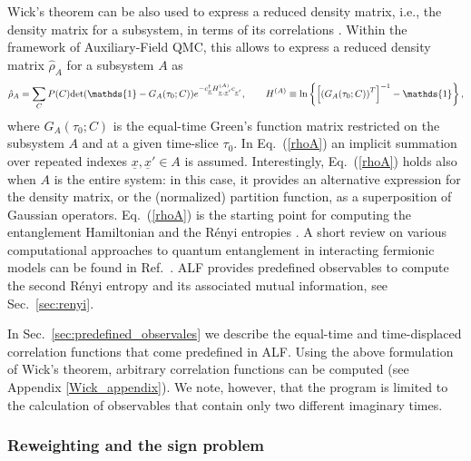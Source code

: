 Wick's theorem can be also used to express a reduced density matrix, i.e., the density matrix for a subsystem, in terms of its correlations \cite{Peschel03}.
Within the framework of Auxiliary-Field QMC, this allows to express a reduced density matrix $\hat{\rho}_A$ for a subsystem $A$ as \cite{Grover13}
\begin{equation}
\hat{\rho}_A = \sum_C P(C){\rm det}(\mathds{1}-G_A(\tau_0; C))e^{-c^{\dagger}_{\underline x} H^{(A)}_{{\underline x}, {\underline x}'}c^{\phantom\dagger}_{{\underline x}'}},\qquad H^{(A)} \equiv \ln\left\{\left[\left(G_A(\tau_0; C)\right)^T\right]^{-1}-\mathds{1}\right\},
\label{rhoA}
\end{equation}
where $G_A(\tau_0; C)$ is the equal-time Green's function matrix restricted on the subsystem $A$ and at a given time-slice $\tau_0$. In Eq.~(\ref{rhoA}) an implicit summation over repeated indexes ${\underline x}, {\underline x}' \in A$ is assumed.
Interestingly, Eq.~(\ref{rhoA}) holds also when $A$ is the entire system: in this case, it provides an alternative expression for the density matrix, or the (normalized) partition function, as a superposition of Gaussian operators.
Eq.~(\ref{rhoA}) is the starting point for computing the entanglement Hamiltonian \cite{Toldin18} and the R\'enyi entropies \cite{Grover13,Assaad13a,Assaad15}.
A short review on various computational approaches to quantum entanglement in interacting fermionic models can be found in Ref.~\cite{ParisenToldin19}.
ALF provides predefined observables to compute the second R\'enyi entropy and its associated mutual information, see Sec.~\ref{sec:renyi}.


In Sec.~\ref{sec:predefined_observales} we describe the equal-time and time-displaced correlation functions that come predefined in ALF.
Using the  above  formulation  of  Wick's theorem, arbitrary  correlation functions can be computed (see Appendix \ref{Wick_appendix}). We note, however, that the program is limited to the calculation of observables that contain only two different imaginary times.  

\subsubsection{Reweighting and the sign problem}\label{sec:reweight}

